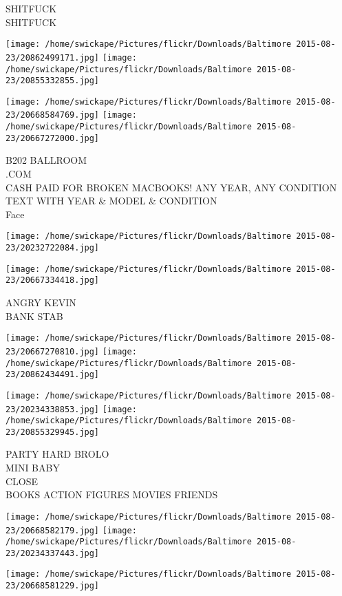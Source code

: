 \documentclass[10pt,letterpaper]{article}
\begin{document}
SHITFUCK\\
SHITFUCK
\pagebreak

\texttt{[image: /home/swickape/Pictures/flickr/Downloads/Baltimore 2015-08-23/20862499171.jpg]}
\texttt{[image: /home/swickape/Pictures/flickr/Downloads/Baltimore 2015-08-23/20855332855.jpg]}

\texttt{[image: /home/swickape/Pictures/flickr/Downloads/Baltimore 2015-08-23/20668584769.jpg]}
\texttt{[image: /home/swickape/Pictures/flickr/Downloads/Baltimore 2015-08-23/20667272000.jpg]}

B202 BALLROOM\\
.COM\\
CASH PAID FOR BROKEN MACBOOKS!  ANY YEAR, ANY CONDITION TEXT WITH YEAR \& MODEL \& CONDITION\\
Face
\pagebreak

\texttt{[image: /home/swickape/Pictures/flickr/Downloads/Baltimore 2015-08-23/20232722084.jpg]}

\vspace{0.25in}
\texttt{[image: /home/swickape/Pictures/flickr/Downloads/Baltimore 2015-08-23/20667334418.jpg]}

ANGRY KEVIN\\
BANK STAB
\pagebreak

\texttt{[image: /home/swickape/Pictures/flickr/Downloads/Baltimore 2015-08-23/20667270810.jpg]}
\texttt{[image: /home/swickape/Pictures/flickr/Downloads/Baltimore 2015-08-23/20862434491.jpg]}

\texttt{[image: /home/swickape/Pictures/flickr/Downloads/Baltimore 2015-08-23/20234338853.jpg]}
\texttt{[image: /home/swickape/Pictures/flickr/Downloads/Baltimore 2015-08-23/20855329945.jpg]}

PARTY HARD BROLO\\
MINI BABY\\
CLOSE\\
BOOKS ACTION FIGURES MOVIES FRIENDS
\pagebreak

\texttt{[image: /home/swickape/Pictures/flickr/Downloads/Baltimore 2015-08-23/20668582179.jpg]}
\texttt{[image: /home/swickape/Pictures/flickr/Downloads/Baltimore 2015-08-23/20234337443.jpg]}

\vspace{0.25in}
\texttt{[image: /home/swickape/Pictures/flickr/Downloads/Baltimore 2015-08-23/20668581229.jpg]}
\end{document}
